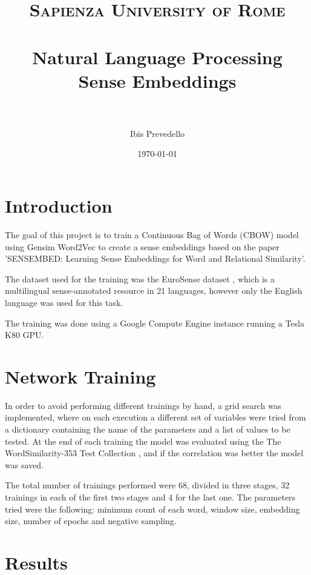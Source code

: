 \documentclass[11pt,oneside,a4paper]{article}
\title{
\normalfont \normalsize
\textsc{Sapienza University of Rome} \\ [25pt] %
\horrule{0.5pt} \\[0.4cm] %
\LARGE Natural Language Processing \\ %
\large Sense Embeddings \\
\horrule{2pt} \\[0.5cm] %
}
\author{Ibis Prevedello} %
\date{\normalsize\today} %
\begin{document}
\maketitle






\section{Introduction}

The goal of this project is to train a Continuous Bag of Words (CBOW) model using Gensim Word2Vec \cite{word2vec} to create a sense embeddings based on the paper 'SENSEMBED: Learning Sense Embeddings for Word and Relational Similarity'\cite{sensembed}.

The dataset used for the training was the EuroSense dataset \cite{eurosense}, which is a multilingual sense-annotated resource in 21 languages, however only the English language was used for this task.

The training was done using a Google Compute Engine instance running a Tesla K80 GPU.


\section{Network Training}

In order to avoid performing different trainings by hand, a grid search was implemented, where on each execution a different set of variables were tried from a dictionary containing the name of the parameters and a list of values to be tested. At the end of each training the model was evaluated using the The WordSimilarity-353 Test Collection \cite{wordsimilarity}, and if the correlation was better the model was saved.

The total number of trainings performed were 68, divided in three stages, 32 trainings in each of the first two stages and 4 for the last one. The parameters tried were the following: minimum count of each word, window size, embedding size, number of epochs and negative sampling.


\section{Results}
\end{document}
